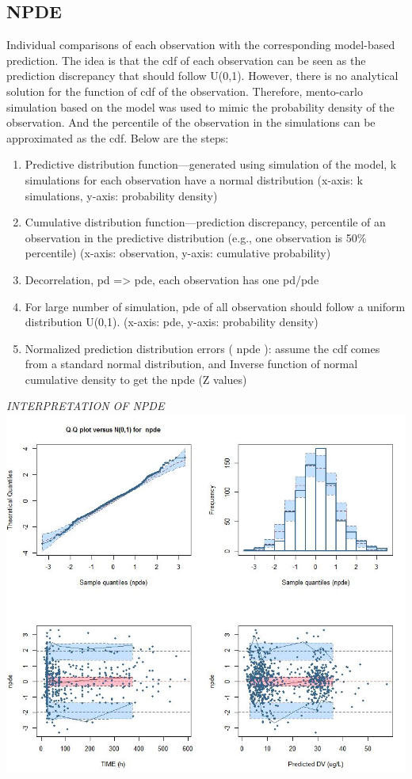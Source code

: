 \documentclass[
]{book}
\begin{document}
\hypertarget{npde}{%
\subsection{NPDE}\label{npde}}

Individual comparisons of each observation with the corresponding model-based prediction. The idea is that the cdf of each observation can be seen as the prediction discrepancy that should follow U(0,1). However, there is no analytical solution for the function of cdf of the observation. Therefore, mento-carlo simulation based on the model was used to mimic the probability density of the observation. And the percentile of the observation in the simulations can be approximated as the cdf. Below are the steps:

\begin{enumerate}
\def\labelenumi{\arabic{enumi}.}
\item
  Predictive distribution function---generated using simulation of the model, k simulations for each observation have a normal distribution (x-axis: k simulations, y-axis: probability density)
\item
  Cumulative distribution function---prediction discrepancy, percentile of an observation in the predictive distribution (e.g., one observation is 50\% percentile) (x-axis: observation, y-axis: cumulative probability)
\item
  Decorrelation, pd =\textgreater{} pde, each observation has one pd/pde
\item
  For large number of simulation, pde of all observation should follow a uniform distribution U(0,1). (x-axis: pde, y-axis: probability density)
\item
  Normalized prediction distribution errors ( npde ): assume the cdf comes from a standard normal distribution, and Inverse function of normal cumulative density to get the npde (Z values)
\end{enumerate}

\emph{INTERPRETATION OF NPDE}
\includegraphics{Figures/NPDE_example_figure.jpg}
\end{document}

